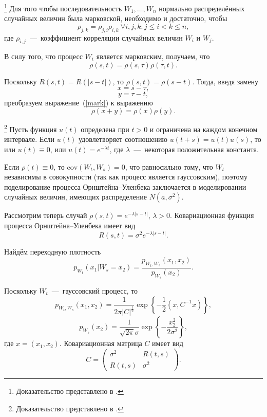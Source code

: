 \begin{theorem}\footnote{Доказательство представлено в \cite{prob_feller}.}
	Для того чтобы последовательность \( W_1,\ldots,W_n \) нормально 
     распределённых случайных величин была марковской, необходимо и 
     достаточно, чтобы
	\[
	\rho_{j,k} = \rho_{j,i} \rho_{i,k} \ \forall i,j,k: j \leq i < k \leq n,
	\]
	где \( \rho_{i,j} \)~---~коэффициент корреляции случайных величин 
     \( W_i \) и \( W_j \).
\end{theorem}

В силу того, что процесс \( W_t \) является марковским, получаем, что
\begin{equation} \label{mark}
\rho(s,t)=\rho(s,\tau)\rho(\tau,t).
\end{equation}

Поскольку \( R(s,t)=R(|s-t|) \), то \( \rho(s,t)=\rho(s-t) \). Тогда, введя замену
\[
x=s-\tau,
\]
\[
y=\tau-t,
\]
преобразуем выражение~(\ref{mark}) к выражению
\[
\rho(x+y)=\rho(x)\rho(y).
\]

\begin{theorem}\footnote{Доказательство представлено в \cite{prob_feller}.}
	Пусть функция \( u(t) \) определена при \( t>0 \) и ограничена на 
     каждом конечном интервале. Если \( u(t) \) удовлетворяет соотношению 
     \( u(t+s)=u(t)u(s) \), то или \( u(t)\equiv0 \), или \( u(t) = 
     e^{-\lambda t} \), где \( \lambda \)~---~некоторая положительная 
     константа.
\end{theorem}

Если \( \rho(t) \equiv 0 \), то \( \text{cov}(W_t,W_s)=0 \), что 
 равносильно тому, что \( W_t \) независимы в совокупности (так как 
 процесс является гауссовским), поэтому поделирование процесса 
 Орнштейна--Уленбека заключается в моделировании случайных величин, 
 имеющих распределение \( N(a,\sigma^2) \).

Рассмотрим теперь случай \( \rho(s,t)=e^{-\lambda|s-t|} \), \( \lambda>0 \). 
 Ковариационная функция процесса Орнштейна--Уленбека имеет вид
\[
R(s,t)=\sigma^2e^{-\lambda|s-t|}.
\]

Найдём переходную плотность
\[
p_{W_t}(x_1|W_s=x_2)=\dfrac{p_{W_t,W_s}(x_1,x_2)}{p_{W_s}(x_2)}.
\]

Поскольку \( W_t \)~---~гауссовский процесс, то
\[
p_{W_t,W_s}(x_1,x_2)=\dfrac{1}{2\pi|C|^{\frac{1}{2}}}\exp\left\lbrace - 
 \dfrac{1}{2}(x,C^{-1}x)\right\rbrace,
\]
\[
p_{W_s}(x_2)=\dfrac{1}{\sqrt{2\pi}\sigma}\exp\left\lbrace - \dfrac{x_2^2}
 {2\sigma^2}\right\rbrace,
\]
где \( x=(x_1,x_2) \). Ковариационная матрица \( C \) имеет вид
\[
C=\begin{pmatrix}
\sigma^2&R(t,s)\\
R(t,s)&\sigma^2
\end{pmatrix}.
\]

